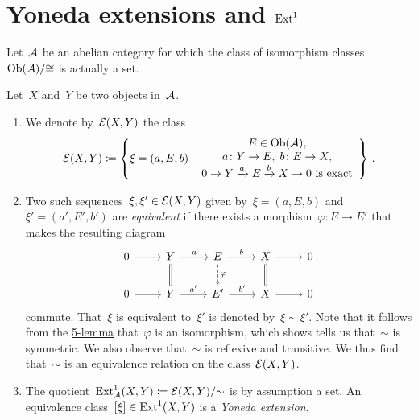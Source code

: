 \section{Yoneda extensions and \texorpdfstring{$\operatorname{Ext}^1$}{Ext 1}}


\begin{conventionnonum}
  Let~$\mathcal{A}$ be an abelian category for which the class of isomorphism classes~$\operatorname{Ob}(\mathcal{A})/{\cong}$ is actually a set.
\end{conventionnonum}


\begin{remarkdefinition}
  Let~$X$ and~$Y$ be two objects in~$\mathcal{A}$.
  \begin{enumerate}
    \item
      We denote by~$\mathcal{E}(X,Y)$ the class
      \[
        \Extensions(X,Y)
        \defined
        \left\{
          \xi
          =
          (a, E, b)
        \suchthat*
          \begin{array}{c}
            E \in \Ob(\Acat),
            \\
            a \colon Y \to E, \;
            b \colon E \to X,
            \\
            \text{$0 \to Y \xto{a} E \xto{b} X \to 0$ is exact}
          \end{array}
        \right\}  \,.
      \]
    \item
      Two such sequences~$\xi, \xi' \in \mathcal{E}(X,Y)$ given by~$\xi = (a,E,b)$ and~$\xi' = (a', E', b')$  are \emph{equivalent} if there exists a morphism~$\varphi \colon E \to E'$ that makes the resulting diagram
      \[
        \begin{tikzcd}
            0
            \arrow{r}
          & Y
            \arrow{r}[above]{a}
            \arrow[equal]{d}
          & E
            \arrow{r}[above]{b}
            \arrow[dashed]{d}[right]{\varphi}
          & X
            \arrow{r}
            \arrow[equal]{d}
          & 0
          \\
            0
            \arrow{r}
          & Y
            \arrow{r}[above]{a'}
          & E'
            \arrow{r}[above]{b'}
          & X
            \arrow{r}
          & 0
        \end{tikzcd}
      \]
      commute.
      That~$\xi$ is equivalent to~$\xi'$ is denoted by~$\xi \sim \xi'$.
      Note that it follows from the \hyperref[5 lemma]{5-lemma} that~$\varphi$ is an isomorphism, which shows tells us that~$\sim$ is symmetric.
      We also observe that~$\sim$ is reflexive and transitive.
      We thus find that~$\sim$ is an equivalence relation on the class~$\mathcal{E}(X,Y)$.
    \item
      The quotient~$\operatorname{Ext}^1_{\mathcal{A}}(X,Y) \coloneqq \mathcal{E}(X,Y)/{\sim}$ is by assumption a set.
      An equivalence class~$[\xi] \in \operatorname{Ext}^1(X,Y)$ is a \emph{Yoneda extension}.
  \end{enumerate}
\end{remarkdefinition}


